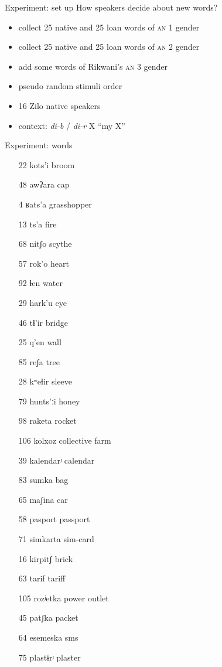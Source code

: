 \documentclass[13pt, t]{beamer}
\begin{document}


\begin{frame}{Experiment: set up}
\alert{How speakers decide about new words?}
\begin{itemize}
\item collect 25 native and 25 loan words of \textsc{an} 1 gender
\item collect 25 native and 25 loan words of \textsc{an} 2 gender
\item add some words of Rikwani's \textsc{an} 3 gender
\item pseudo random stimuli order
\item 16 Zilo native speakers
\item context:  \textit{di-b} / \textit{di-r} X ``my  X''
\end{itemize}
\end{frame}

\begin{frame}{Experiment: words}
\begin{multicols}{2}
\begin{itemize}
\item[22]    kots'i broom
\item[48]    awʔara cap
\item[4] ʁats'a grasshopper
\item[13]      ts'a fire
\item[68]      nitʃo scythe
\item[57]    rok'o heart
\item[92]        ɬen water
\item[29]     hark'u eye
\item[46]      tɬ'ir bridge
\item[25]      q'en wall
\item[85]     reʃa tree
\item[28]    kʷeɬir sleeve
\item[79]    hunts'ːi honey
\item[98]       raketa rocket
\item[106]       kolxoz collective farm
\item[39] 	kalendarʲ calendar
\item[83]         sumka bag
\item[65]       maʃina car
\item[58]    pasport passport
\item[71]       simkarta  sim-card
\item[16]      kirpitʃ brick
\item[63]         tarif tariff
\item[105]    rozʲetka  power outlet
\item[45]        patʃka packet
\item[64]      esemeska sms
\item[75]   plastɨrʲ plaster
\end{itemize}
\end{multicols}
\end{frame}
\end{document}
